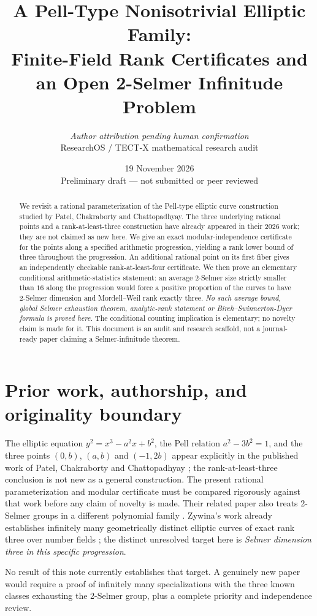 \documentclass[11pt]{article}
\title{A Pell-Type Nonisotrivial Elliptic Family:\\
Finite-Field Rank Certificates and an Open 2-Selmer Infinitude Problem}
\author{\textit{Author attribution pending human confirmation}\\
\small ResearchOS / TECT-X mathematical research audit}
\date{19 November 2026\\[0.2em]\small Preliminary draft --- not submitted or peer reviewed}
\begin{document}
\maketitle
\begin{abstract}
We revisit a rational parameterization of the Pell-type elliptic
curve construction studied by Patel, Chakraborty and Chattopadhyay.
The three underlying rational points and a rank-at-least-three
construction have already appeared in their 2026 work; they are not
claimed as new here. We give an exact modular-independence certificate
for the points along a specified arithmetic progression, yielding a
rank lower bound of three throughout the progression. An additional rational point on its first
fiber gives an independently checkable rank-at-least-four certificate.
We then prove an elementary conditional arithmetic-statistics
statement: an average 2-Selmer size strictly smaller than $16$ along
the progression would force a positive proportion of the curves to
have 2-Selmer dimension and Mordell--Weil rank exactly three.
\emph{No such average bound, global Selmer exhaustion theorem,
analytic-rank statement or Birch--Swinnerton-Dyer formula is proved here.}
The conditional counting implication is elementary; no novelty claim is
made for it. This document is an audit and research scaffold, not a
journal-ready paper claiming a Selmer-infinitude theorem.
\end{abstract}

\section{Prior work, authorship, and originality boundary}
The elliptic equation $y^2=x^3-a^2x+b^2$, the Pell relation
$a^2-3b^2=1$, and the three points $(0,b)$, $(a,b)$ and
$(-1,2b)$ appear explicitly in the published work of Patel,
Chakraborty and Chattopadhyay \cite{PatelEtAl2026Pell};
the rank-at-least-three conclusion is not new as a general
construction. The present rational parameterization and modular
certificate must be compared rigorously against that work before
any claim of novelty is made. Their related paper also treats
2-Selmer groups in a different polynomial family
\cite{PatelEtAl2026Selmer}. Zywina's work already establishes
infinitely many geometrically distinct elliptic curves of exact
rank three over number fields \cite{Zywina2026}; the distinct
unresolved target here is \emph{Selmer dimension three in this
specific progression}.

No result of this note currently establishes that target.
A genuinely new paper would require a proof of infinitely many
specializations with the three known classes exhausting the
2-Selmer group, plus a complete priority and independence review.
\end{document}
